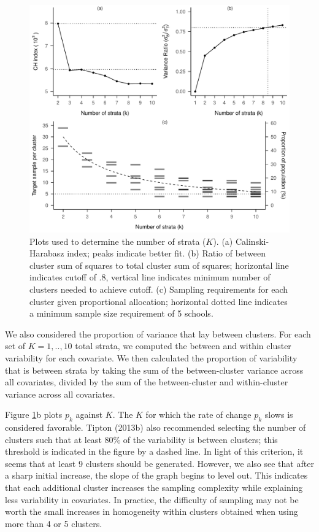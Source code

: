 \documentclass[
  english,
  man,floatsintext]{apa6}
\begin{document}
\begin{figure}[tbp]
\includegraphics[width=1\linewidth]{6---Paper_files/figure-latex/fig-k-plots-1} \caption{Plots used to determine the number of strata (\(K\)). (a) Calinski-Harabasz index; peaks indicate better fit. (b) Ratio of between cluster sum of squares to total cluster sum of squares; horizontal line indicates cutoff of .8, vertical line indicates minimum number of clusters needed to achieve cutoff. (c) Sampling requirements for each cluster given proportional allocation; horizontal dotted line indicates a minimum sample size requirement of 5 schools. }\label{fig:fig-k-plots}
\end{figure}

We also considered the proportion of variance that lay between clusters. For each set of \(K = 1,..,10\) total strata, we computed the between and within cluster variability for each covariate. We then calculated the proportion of variability that is between strata by taking the sum of the between-cluster variance across all covariates, divided by the sum of the between-cluster and within-cluster variance across all covariates.

Figure \ref{fig:fig-k-plots}b plots \(p_k\) against \(K\). The \(K\) for which the rate of change \(p_k\) slows is considered favorable. Tipton (2013b) also recommended selecting the number of clusters such that at least 80\% of the variability is between clusters; this threshold is indicated in the figure by a dashed line. In light of this criterion, it seems that at least 9 clusters should be generated. However, we also see that after a sharp initial increase, the slope of the graph begins to level out. This indicates that each additional cluster increases the sampling complexity while explaining less variability in covariates. In practice, the difficulty of sampling may not be worth the small increases in homogeneity within clusters obtained when using more than 4 or 5 clusters.
\end{document}
